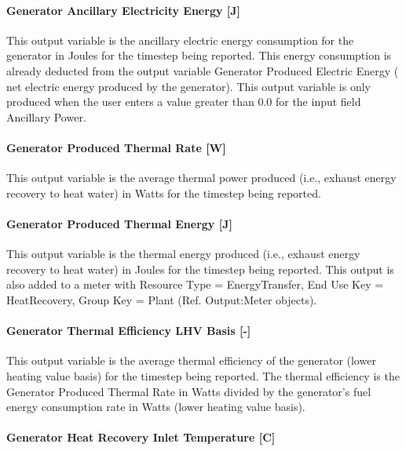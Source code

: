 \paragraph{Generator Ancillary Electricity Energy {[}J{]}}\label{generator-ancillary-electric-energy-j}

This output variable is the ancillary electric energy consumption for the generator in Joules for the timestep being reported. This energy consumption is already deducted from the output variable Generator Produced Electric Energy ( net electric energy produced by the generator). This output variable is only produced when the user enters a value greater than 0.0 for the input field Ancillary Power.

\paragraph{Generator Produced Thermal Rate {[}W{]}}\label{generator-produced-thermal-rate-w-1}

This output variable is the average thermal power produced (i.e., exhaust energy recovery to heat water) in Watts for the timestep being reported.

\paragraph{Generator Produced Thermal Energy {[}J{]}}\label{generator-produced-thermal-energy-j-1}

This output variable is the thermal energy produced (i.e., exhaust energy recovery to heat water) in Joules for the timestep being reported. This output is also added to a meter with Resource Type = EnergyTransfer, End Use Key = HeatRecovery, Group Key = Plant (Ref. Output:Meter objects).

\paragraph{Generator Thermal Efficiency LHV Basis {[}-{]}}\label{generator-thermal-efficiency-lhv-basis--}

This output variable is the average thermal efficiency of the generator (lower heating value basis) for the timestep being reported. The thermal efficiency is the Generator Produced Thermal Rate in Watts divided by the generator's fuel energy consumption rate in Watts (lower heating value basis).

\paragraph{Generator Heat Recovery Inlet Temperature {[}C{]}}\label{generator-heat-recovery-inlet-temperature-c-1}

